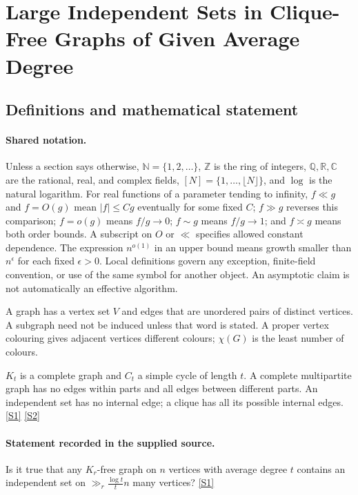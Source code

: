 \documentclass[11pt,a4paper]{article}
\newcommand{\N}{\mathbb{N}}
\newcommand{\Z}{\mathbb{Z}}
\newcommand{\Q}{\mathbb{Q}}
\newcommand{\R}{\mathbb{R}}
\newcommand{\C}{\mathbb{C}}
\newcommand{\sref}[2]{\hyperlink{source:#1:#2}{[S#2]}}
\begin{document}
\section{Large Independent Sets in Clique-Free Graphs of Given Average Degree}\label{statement}


\subsection{Definitions and mathematical statement}

\paragraph{Shared notation.}Unless a section says otherwise, $\N=\{1,2,\ldots\}$,
$\Z$ is the ring of integers, $\Q,\R,\C$ are the rational, real, and complex
fields, $[N]=\{1,\ldots,\lfloor N\rfloor\}$, and $\log$ is the natural
logarithm. For real functions of a parameter tending to infinity,
$f\ll g$ and $f=O(g)$ mean $|f|\leq Cg$ eventually for some fixed $C$;
$f\gg g$ reverses this comparison; $f=o(g)$ means $f/g\to0$;
$f\sim g$ means $f/g\to1$; and $f\asymp g$ means both order bounds.
A subscript on $O$ or $\ll$ specifies allowed constant dependence.
The expression $n^{o(1)}$ in an upper bound means growth smaller than
$n^\epsilon$ for each fixed $\epsilon>0$. Local definitions govern any
exception, finite-field convention, or use of the same symbol for another
object. An asymptotic claim is not automatically an effective algorithm.



A graph has a vertex set $V$ and edges that are unordered pairs of distinct vertices. A subgraph need not be induced unless that word is stated. A proper vertex colouring gives adjacent vertices different colours; $\chi(G)$ is the least number of colours.

$K_t$ is a complete graph and $C_t$ a simple cycle of length $t$. A complete multipartite graph has no edges within parts and all edges between different parts. An independent set has no internal edge; a clique has all its possible internal edges. \sref{statement}{1} \sref{statement}{2}

\paragraph{Statement recorded in the supplied source.}
Is it true that any $K_r$-free graph on $n$ vertices with average degree $t$ contains an independent set on $ \gg_r \frac{\log t}{t}n $ many vertices? \sref{statement}{1}
\end{document}
